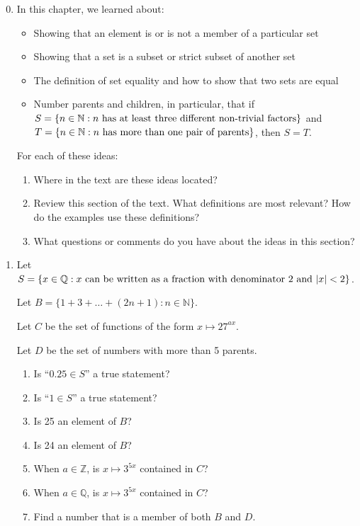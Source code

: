 \documentclass[11pt]{article}
\newcommand\tn{\textnormal}
\newcommand{\Q}{\mathbb{Q}}
\newcommand{\N}{\mathbb{N}}
\newcommand{\Z}{\mathbb{Z}}
\newcommand\st{:}
\theoremstyle{definition}
\begin{document}
\begin{enumerate}
\setcounter{enumi}{-1}
\item %
\label{p: set ideas}
	In this chapter, we learned about:
		\begin{itemize}
		\item Showing that an element is or is not a member of a particular set
		\item Showing that a set is a subset or strict subset of another set
		\item The definition of set equality and how to show that two sets are equal
		\item Number parents and children, in particular, that if $S=\{n\in\N \st n \tn{ has at least three different non-trivial factors}\}$ and $T=\{n\in \N\st n \tn{ has more than one pair of parents}\}$, then $S=T$.
		\end{itemize}
	For each of these ideas:
		\begin{enumerate}
		\item Where in the text are these ideas located?
		\item Review this section of the text.	What definitions are most relevant? How do the examples use these definitions?	
		\item What questions or comments do you have about the ideas in this section?
		\end{enumerate}
\item %
Let $S=\{x\in \Q\st x \tn{ can be written as a fraction with denominator 2 and } |x|<2\}$.

Let $B = \{1+3+\dots + (2n+1) \st n\in \N\}$.

Let $C$ be the set of functions of the form $x \mapsto 27^{ax}$. 

Let $D$ be the set of numbers with more than 5 parents.

	\begin{enumerate}
	\item Is ``$0.25\in S$'' a true statement? 
	\item Is ``$1\in S$'' a true statement?
	\item Is 25 an element of $B$? 
	\item Is 24 an element of $B$? 
	\item When $a\in \Z$, is $x\mapsto 3^{5x}$ contained in $C$?
	\item When $a\in \Q$, is $x\mapsto 3^{5x}$ contained in $C$?
	\item Find a number that is a member of both $B$ and $D$.
	\end{enumerate}


\end{enumerate}
\end{document}
